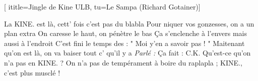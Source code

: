  [
ititle={Jingle de Kine ULB}, 
tu={Le Sampa (Richard Gotainer)}]

\beginverse
La KINE. est là, cett' fois c'est pas du blabla
Pour niquer vos gonzesses, on a un plan extra
On caresse le haut, on pénètre le bas
Ça s'enclenche à l'envers mais aussi à l'endroit
C'est fini le temps des : " Moi y'en a savoir pas ! "
Maitenant qu'on est là, on va baiser tout c' qu'il y a
\textit{Parlé :} Ça fait : C.K.
Qu'est-ce qu'on n'a pas en KINE. ?
On n'a pas de tempérament à boire du raplapla ;
KINE., c'est plus musclé !
\endverse
\endsong
